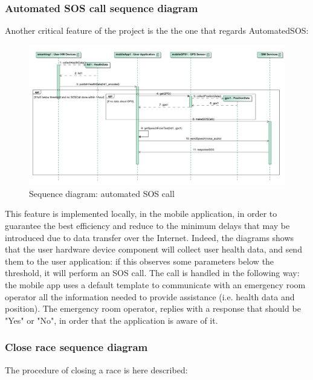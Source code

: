 \subsubsection{Automated SOS call sequence diagram}
Another critical feature of the project is the the one that regards AutomatedSOS: 

\begin{figure}[H]
\includegraphics[width=\linewidth]{Images/automatedsos.pdf}
\caption{ Sequence diagram: automated SOS call}
\label{fig:automatedSOScall}
\end{figure}

This feature is implemented locally, in the mobile application, in order to guarantee the best efficiency and reduce to the minimum delays
that may be introduced due to data transfer over the Internet. 
Indeed, the diagrams shows that the user hardware device component will collect user health data, and send them to the user application: if this observes some parameters below the threshold, it will perform an SOS call. 
The call is handled in the following way: the mobile app uses a default template to communicate with an emergency room operator all the
information needed to provide assistance (i.e. health data and position). 
The emergency room operator, replies with a response that should be "Yes" or "No", in order that the application is aware of it.  \\

\subsubsection{Close race sequence diagram}
The procedure of closing a race is here described: 

